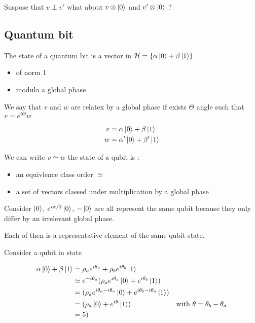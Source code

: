 \documentclass{article}
\begin{document}
    Suspose that $v \perp v'$ what about $v \otimes \ket{0}$ and $v' \otimes
    \ket{0}$ ?

  \subsection{Quantum bit}

    The state of a quantum bit is a vector in $\mathcal{H} = \{\alpha \ket{0} +
    \beta \ket{1}\}$

    \begin{itemize}
      \item of norm 1
      \item modulo a global phase
    \end{itemize}

    We say that $v$ and $w$  are relatex by a global phase if exists $\Theta$
    angle such that $v = e^{i\Theta}w$

    \begin{align*}
      v &= \alpha \ket{0} + \beta \ket{1} \\
      w &= \alpha' \ket{0} + \beta' \ket{1}
    \end{align*}

    We can write $v \simeq w$ the state of a qubit is : 
    \begin{itemize}
      \item an equivlence class order $\simeq$ 
      \item a set of vectors classed under multiplication by a global phase
    \end{itemize}


    Consider $\ket{0}$, $e^{i \pi/2}\ket{0}$, $-\ket{0}$ are all represent the
    same qubit because they only differ by an irrelevant global phase.

    Each of then is a representative element of the same qubit state.


    Consider a qubit in state 
    
    \begin{align*}
      \alpha \ket{0} + \beta \ket{1} &= \rho_a e^{i\theta_a} + \rho_b e^{i\theta_b} \ket{1} \\
      &\simeq e^{-i\theta_a}(\rho_a  e^{i\theta_a}  \ket{0} + e^{i\theta_b} \ket{1}) \\
      &= (\rho_a e^{i\theta_a - i \theta_a} \ket{0} + e^{i\theta_b - i\theta_a} \ket{1}) \\
      &= (\rho_a \ket{0} + e^{i\theta} \ket{1}) & \text{with } \theta = \theta_b - \theta_a \\
      &= 5)
    \end{align*}
\end{document}
